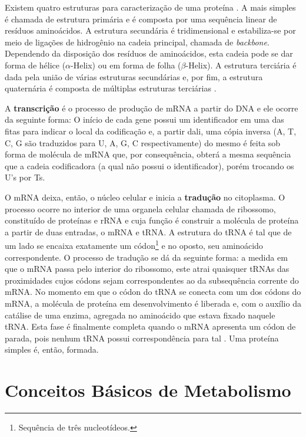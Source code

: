 \indent Existem quatro estruturas para caracterização de uma proteína \cite{setubal97}. A mais simples é chamada de estrutura primária e é composta por uma sequência linear de resíduos aminoácidos. A estrutura secundária é tridimensional e estabiliza-se por meio de ligações de hidrogênio na cadeia principal, chamada de \textit{backbone}. Dependendo da disposição dos resíduos de aminoácidos, esta cadeia pode se dar forma de hélice ($\alpha$-Helix) ou em forma de folha ($\beta$-Helix). A estrutura terciária é dada pela união de várias estruturas secundárias e, por fim, a estrutura quaternária é composta de múltiplas estruturas terciárias \cite{drug09}.

\indent A \textbf{transcrição} é o processo de produção de mRNA a partir do DNA e ele ocorre da seguinte forma: O início de cada gene possui um identificador em uma das fitas para indicar o local da codificação e, a partir dali, uma cópia inversa (A, T, C, G são traduzidos para U, A, G, C respectivamente) do mesmo é feita sob forma de molécula de mRNA que, por consequência, obterá a mesma sequência que a cadeia codificadora (a qual não possui o identificador), porém trocando os U's por Ts.

\indent O mRNA deixa, então, o núcleo celular e inicia a \textbf{tradução} no citoplasma. O processo ocorre no interior de uma organela celular chamada de ribossomo, constituído de proteínas e rRNA e cuja função é construir a molécula de proteína a partir de duas entradas, o mRNA e tRNA. A estrutura do tRNA é tal que de um lado se encaixa exatamente um códon\footnote{Sequência de três nucleotídeos.} e no oposto, seu aminoácido correspondente. O processo de tradução se dá da seguinte forma: a medida em que o mRNA passa pelo interior do ribossomo, este atrai quaisquer tRNAs das proximidades cujos códons sejam correspondentes ao da subsequência corrente do mRNA. No momento em que o códon do tRNA se conecta com um dos códons do mRNA, a molécula de proteína em desenvolvimento é liberada e, com o auxílio da catálise de uma enzima, agregada no aminoácido que estava fixado naquele tRNA. Esta fase é finalmente completa quando o mRNA apresenta um códon de parada, pois nenhum tRNA possui correspondência para tal \cite{setubal97}. Uma proteína simples é, então, formada.



\section{Conceitos Básicos de Metabolismo}

